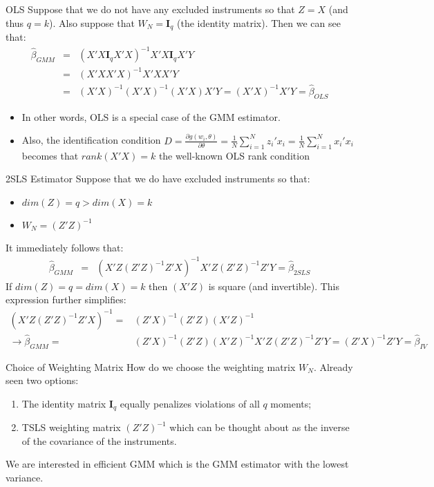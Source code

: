 \documentclass[aspectratio=169]{beamer}
\begin{document}
\begin{frame}{OLS}
Suppose that we do not have any excluded instruments so that $Z=X$ (and thus $q=k$). Also suppose that $W_N = \mathbf{I}_q$ (the identity matrix). Then we can see that:
\begin{eqnarray*}
\hat{\beta}_{GMM} &=& (X'X \mathbf{I}_q X' X)^{-1} X' X \mathbf{I}_q X'Y\\
 &=& (X'X X' X)^{-1} X' X X'Y\\
 &=& (X'X)^{-1} (X' X)^{-1} (X' X) X'Y =  (X'X)^{-1} X'Y = \hat{\beta}_{OLS}
\end{eqnarray*}
\begin{itemize}
\item In other words, OLS is a special case of the GMM estimator. 
\item Also, the identification condition $D=\frac{\partial g(w_i,\theta)}{\partial \theta} =\frac{1}{N} \sum_{i=1}^N z_i' x_i = \frac{1}{N} \sum_{i=1}^N x_i' x_i$ becomes that $rank(X'X) = k$ the well-known OLS rank condition
\end{itemize}
\end{frame}

\begin{frame}{2SLS Estimator}
Suppose that we do have excluded instruments so that:
\begin{itemize}
\item  $dim(Z) = q > dim(X) = k$ 
\item $W_N = (Z'Z)^{-1}$
\end{itemize}
It immediately follows that:
\begin{eqnarray*}
\hat{\beta}_{GMM} &=& (X'Z (Z'Z)^{-1} Z' X)^{-1} X' Z (Z'Z)^{-1} Z'Y = \hat{\beta}_{2SLS}
\end{eqnarray*}
If $dim(Z) = q = dim(X) = k$ then $(X'Z)$ is square (and invertible). This expression further simplifies:
\begin{align*}
(X'Z (Z'Z)^{-1} Z' X)^{-1} =& (Z'X)^{-1} (Z'Z) (X'Z)^{-1}\\
\rightarrow \hat{\beta}_{GMM} =& (Z'X)^{-1} (Z'Z) (X'Z)^{-1}  X' Z (Z'Z)^{-1} Z'Y = (Z'X)^{-1} Z'Y = \hat{\beta}_{IV}
\end{align*}
\end{frame}

\begin{frame}{Choice of Weighting Matrix}
How do we choose the weighting matrix $W_N$. Already seen two options: 
\begin{enumerate}
\item  The identity matrix $\mathbf{I}_q$ equally penalizes violations of all $q$ moments;
\item TSLS weighting matrix $(Z'Z)^{-1}$ which can be thought about as the inverse of the covariance of the instruments. 
\end{enumerate}  
We are interested in \alert{efficient GMM} which is the GMM estimator with the lowest variance. 
\end{frame}
\end{document}
